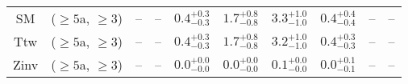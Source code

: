 \begin{table}[h!]
{\begin{tabular}{cccccccccc}
	SM & ($\ge5$a, $\ge3$) & -- & -- & $0.4^{+ 0.3 }_{- 0.3 }$ & $1.7^{+ 0.8 }_{- 0.8 }$ & $3.3^{+ 1.0 }_{- 1.0 }$ & $0.4^{+ 0.4 }_{- 0.4 }$ & -- & -- \\[0.5ex] 
	Ttw & ($\ge5$a, $\ge3$) & -- & -- & $0.4^{+ 0.3 }_{- 0.3 }$ & $1.7^{+ 0.8 }_{- 0.8 }$ & $3.2^{+ 1.0 }_{- 1.0 }$ & $0.4^{+ 0.3 }_{- 0.3 }$ & -- & -- \\[0.5ex] 
	Zinv & ($\ge5$a, $\ge3$) & -- & -- & $0.0^{+ 0.0 }_{- 0.0 }$ & $0.0^{+ 0.0 }_{- 0.0 }$ & $0.1^{+ 0.0 }_{- 0.0 }$ & $0.0^{+ 0.1 }_{- 0.1 }$ & -- & -- \\[0.5ex] 
	\hline
	\hline
\end{tabular}}
\end{table}
